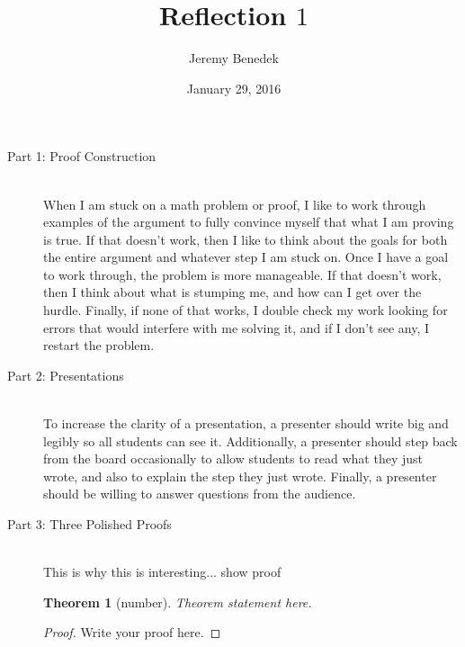 \documentclass{article}
\title{Reflection $1$}
\author{Jeremy Benedek}
\date{January 29, 2016}
\newtheorem*{thm}{Theorem}
\begin{document}
\maketitle

\begin{description}
	\item[Part 1: Proof Construction] \hfill \\
		When I am stuck on a math problem or proof, I like to work through examples of the argument to fully convince myself that
		what I am proving is true. If that doesn't work, then I like to think about the goals for both the entire argument 
		and whatever step I am stuck on. Once I have a goal to
		work through, the problem is more manageable. If that doesn't work, then I think about what is stumping me,
		and how can I get over the hurdle. Finally, if none of that works, I double check my work looking for errors
		that would interfere with  me solving it, and if I don't see any, I restart the problem.  
	\item[Part 2: Presentations] \hfil \\
		To increase the clarity of a presentation, a presenter should write big and legibly so all students can see it. Additionally, 
		a presenter should step back from the board occasionally to allow students to read what they just wrote, and also to explain 
		the step they just wrote.  Finally, a presenter should be willing to answer questions from the audience.  
	
	\item[Part 3: Three Polished Proofs] \hfil \\
		This is why this is interesting... show proof

		\begin{thm}[number]
    			Theorem statement here.
		\end{thm}

		\begin{proof}
    			Write your proof here.
		\end{proof}


\end{description}
\end{document}
